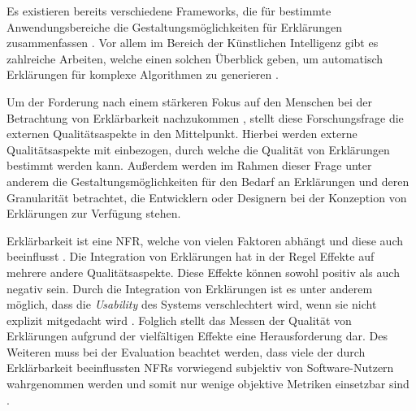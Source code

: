 \smallskip

\noindent{}

\smallskip

Es existieren bereits verschiedene Frameworks, die für bestimmte Anwendungsbereiche die Gestaltungsmöglichkeiten für Erklärungen zusammenfassen \cite{nunes_systematic_2017}. Vor allem im Bereich der Künstlichen Intelligenz gibt es zahlreiche Arbeiten, welche einen solchen Überblick geben, um automatisch Erklärungen für komplexe Algorithmen zu generieren \cite{sokol_explainability_2020, mahoney2019framework}.

Um der Forderung nach einem stärkeren Fokus auf den Menschen bei der Betrachtung von Erklärbarkeit nachzukommen \cite{ehsan_operationalizing_2021}, stellt diese Forschungsfrage die externen Qualitätsaspekte \cite{international2011iso} in den Mittelpunkt. Hierbei werden externe Qualitätsaspekte mit einbezogen, durch welche die Qualität von Erklärungen bestimmt werden kann. Außerdem werden im Rahmen dieser Frage unter anderem die Gestaltungsmöglichkeiten für den Bedarf an Erklärungen und deren Granularität betrachtet, die Entwicklern oder Designern bei der Konzeption von Erklärungen zur Verfügung stehen. 


\smallskip

\noindent{}

\smallskip

Erklärbarkeit ist eine NFR, welche von vielen Faktoren abhängt und diese auch beeinflusst \cite{chazette_knowledge_nodate}. Die Integration von Erklärungen hat in der Regel Effekte auf mehrere andere Qualitätsaspekte. Diese Effekte können sowohl positiv als auch negativ sein. Durch die Integration von Erklärungen ist es unter anderem möglich, dass die \textit{Usability} des Systems verschlechtert wird, wenn sie nicht explizit mitgedacht wird \cite{sokol_explainability_2020}. Folglich stellt das Messen der Qualität von Erklärungen aufgrund der vielfältigen Effekte eine Herausforderung dar. Des Weiteren muss bei der Evaluation beachtet werden, dass viele der durch Erklärbarkeit beeinflussten NFRs vorwiegend subjektiv von Software-Nutzern wahrgenommen werden und somit nur wenige objektive Metriken einsetzbar sind \cite{sokol_explainability_2020}.

